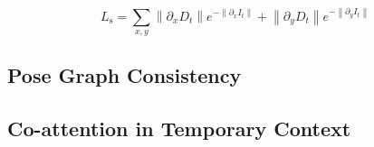 \begin{equation}
  \label{smooth}
  L_{\mathrm{s}}=\sum_{x, y}\left\|\partial_{x} D_{t}\right\| e^{-\left\|\partial_{x} I_{t}\right\|}+\left\|\partial_{y} D_{t}\right\| e^{-\left\|\partial_{y} I_{t}\right\|}
\end{equation}

\subsection{Pose Graph Consistency}

\subsection{Co-attention in Temporary Context}